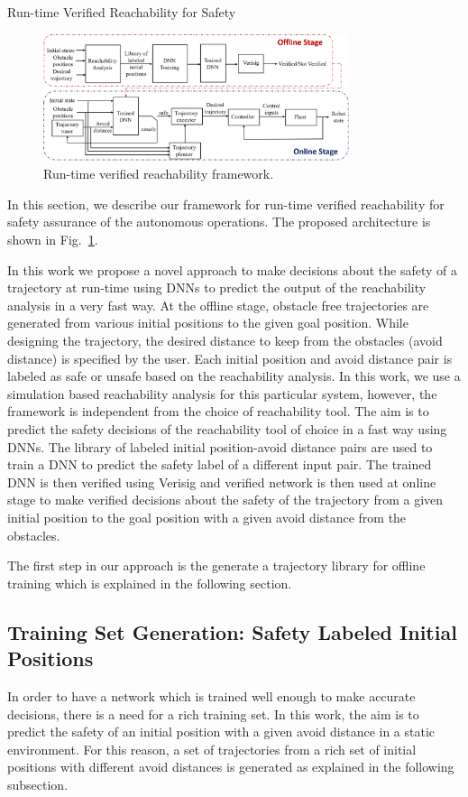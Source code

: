 \begin{section}{Run-time Verified Reachability for Safety} \label{sec:method}
\begin{figure}[t]
	\centering
	\includegraphics[width=0.8\textwidth]{figures/detailed_approach}
	\caption{Run-time verified reachability framework.}	
	\label{fig:det_app}
\end{figure}

In this section, we describe our framework for run-time verified reachability for safety assurance of the autonomous operations. The proposed architecture is shown in Fig.~\ref{fig:det_app}.

In this work we propose a novel approach to make decisions about the safety of a trajectory at run-time using DNNs to predict the output of the reachability analysis in a very fast way. At the offline stage, obstacle free trajectories are generated from various initial positions to the given goal position. While designing the trajectory, the desired distance to keep from the obstacles (avoid distance) is specified by the user. Each initial position and avoid distance pair is labeled as safe or unsafe based on the reachability analysis. In this work, we use a simulation based reachability analysis for this particular system, however, the framework is independent from the choice of reachability tool. The aim is to predict the safety decisions of the reachability tool of choice in a fast way using DNNs. The library of labeled initial position-avoid distance pairs are used to train a DNN to predict the safety label of a different input pair. The trained DNN is then verified using Verisig and verified network is then used at online stage to make verified decisions about the safety of the trajectory from a given initial position to the goal position with a given avoid distance from the obstacles. 

The first step in our approach is the generate a trajectory library for offline training which is explained in the following section.
\subsection{Training Set Generation: Safety Labeled Initial Positions}
In order to have a network which is trained well enough to make accurate decisions, there is a need for a rich training set. In this work, the aim is to predict the safety of an initial position with a given avoid distance in a static environment. For this reason, a set of trajectories from a rich set of initial positions with different avoid distances is generated as explained in the following subsection.

\end{section}
